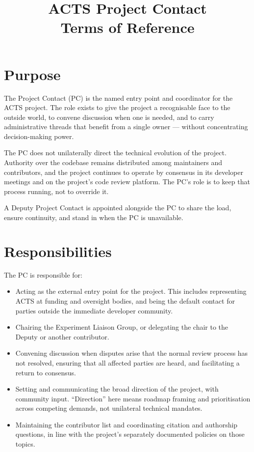 \documentclass[11pt,a4paper]{article}
\title{ACTS Project Contact \\ \large Terms of Reference}
\author{}
\date{\docstamp}
\begin{document}
\maketitle
\thispagestyle{empty}

\section*{Purpose}

The Project Contact (PC) is the named entry point and coordinator for the ACTS
project. The role exists to give the project a recognisable face to the outside
world, to convene discussion when one is needed, and to carry administrative threads
that benefit from a single owner --- without concentrating decision-making power.

The PC does not unilaterally direct the technical evolution of the project.
Authority over the codebase remains distributed among maintainers and contributors,
and the project continues to operate by consensus in its developer meetings and on
the project's code review platform. The PC's role is to keep that process running,
not to override it.

A Deputy Project Contact is appointed alongside the PC to share the load, ensure
continuity, and stand in when the PC is unavailable.

\section*{Responsibilities}

The PC is responsible for:
\begin{itemize}
    \item Acting as the external entry point for the project. This includes
          representing ACTS at funding and oversight bodies, and being the default
          contact for parties outside the immediate developer community.
    \item Chairing the Experiment Liaison Group, or delegating the chair to the
          Deputy or another contributor.
    \item Convening discussion when disputes arise that the normal review process
          has not resolved, ensuring that all affected parties are heard, and
          facilitating a return to consensus.
    \item Setting and communicating the broad direction of the project, with
          community input. ``Direction'' here means roadmap framing and
          prioritisation across competing demands, not unilateral technical
          mandates.
    \item Maintaining the contributor list and coordinating citation and authorship
          questions, in line with the project's separately documented policies on
          those topics.
\end{itemize}
\end{document}
